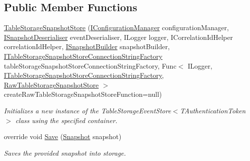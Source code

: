 \subsection*{Public Member Functions}
\begin{DoxyCompactItemize}
\item 
\hyperlink{classCqrs_1_1Azure_1_1BlobStorage_1_1Events_1_1TableStorageSnapshotStore_aabf9c09c22958ca7acf6e717337a14d6_aabf9c09c22958ca7acf6e717337a14d6}{Table\+Storage\+Snapshot\+Store} (\hyperlink{interfaceCqrs_1_1Configuration_1_1IConfigurationManager}{I\+Configuration\+Manager} configuration\+Manager, \hyperlink{interfaceCqrs_1_1Events_1_1ISnapshotDeserialiser}{I\+Snapshot\+Deserialiser} event\+Deserialiser, I\+Logger logger, I\+Correlation\+Id\+Helper correlation\+Id\+Helper, \hyperlink{interfaceCqrs_1_1Events_1_1ISnapshotBuilder}{I\+Snapshot\+Builder} snapshot\+Builder, \hyperlink{interfaceCqrs_1_1Azure_1_1BlobStorage_1_1ITableStorageSnapshotStoreConnectionStringFactory}{I\+Table\+Storage\+Snapshot\+Store\+Connection\+String\+Factory} table\+Storage\+Snapshot\+Store\+Connection\+String\+Factory, Func$<$ I\+Logger, \hyperlink{interfaceCqrs_1_1Azure_1_1BlobStorage_1_1ITableStorageSnapshotStoreConnectionStringFactory}{I\+Table\+Storage\+Snapshot\+Store\+Connection\+String\+Factory}, \hyperlink{classCqrs_1_1Azure_1_1BlobStorage_1_1Events_1_1TableStorageSnapshotStore_1_1RawTableStorageSnapshotStore}{Raw\+Table\+Storage\+Snapshot\+Store} $>$ create\+Raw\+Table\+Storage\+Snapshot\+Store\+Function=null)
\begin{DoxyCompactList}\small\item\em Initializes a new instance of the Table\+Storage\+Event\+Store$<$\+T\+Authentication\+Token$>$ class using the specified container. \end{DoxyCompactList}\item 
override void \hyperlink{classCqrs_1_1Azure_1_1BlobStorage_1_1Events_1_1TableStorageSnapshotStore_a25ec7d179773aec79febdf0e8873b285_a25ec7d179773aec79febdf0e8873b285}{Save} (\hyperlink{classCqrs_1_1Snapshots_1_1Snapshot}{Snapshot} snapshot)
\begin{DoxyCompactList}\small\item\em Saves the provided {\itshape snapshot}  into storage. \end{DoxyCompactList}\end{DoxyCompactItemize}
